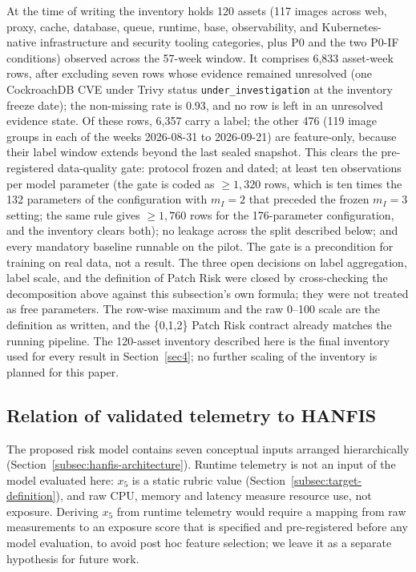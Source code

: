 \documentclass[referee,lineno,pdflatex,sn-basic]{sn-jnl}%
\theoremstyle{thmstyleone}%
\theoremstyle{thmstyletwo}%
\theoremstyle{thmstylethree}%
\begin{document}
At the time of writing the inventory holds 120 assets (117 images across web, proxy, cache, database, queue, runtime, base, observability, and Kubernetes-native infrastructure and security tooling categories, plus P0 and the two P0-IF conditions) observed across the 57-week window. It comprises 6{,}833 asset-week rows, after excluding seven rows whose evidence remained unresolved (one CockroachDB CVE under Trivy status \texttt{under\_investigation} at the inventory freeze date); the non-missing rate is 0.93, and no row is left in an unresolved evidence state. Of these rows, 6{,}357 carry a label; the other 476 (119 image groups in each of the weeks 2026-08-31 to 2026-09-21) are feature-only, because their label window extends beyond the last sealed snapshot. This clears the pre-registered data-quality gate: protocol frozen and dated; at least ten observations per model parameter (the gate is coded as $\ge 1{,}320$ rows, which is ten times the 132 parameters of the configuration with $m_I=2$ that preceded the frozen $m_I=3$ setting; the same rule gives $\ge 1{,}760$ rows for the 176-parameter configuration, and the inventory clears both); no leakage across the split described below; and every mandatory baseline runnable on the pilot. The gate is a precondition for training on real data, not a result. The three open decisions on label aggregation, label scale, and the definition of Patch Risk were closed by cross-checking the decomposition above against this subsection's own formula; they were not treated as free parameters. The row-wise maximum and the raw 0--100 scale are the definition as written, and the \{0,1,2\} Patch Risk contract already matches the running pipeline. The 120-asset inventory described here is the final inventory used for every result in
Section~\ref{sec4}; no further scaling of the inventory is planned for this paper.

\subsection{Relation of validated telemetry to HANFIS}
\label{subsec:hanfis-integration}

The proposed risk model contains seven conceptual inputs arranged hierarchically (Section~\ref{subsec:hanfis-architecture}). Runtime telemetry is not an input of the model evaluated here: $x_5$ is a static rubric value (Section~\ref{subsec:target-definition}), and raw CPU, memory and latency measure resource use, not exposure. Deriving $x_5$ from runtime telemetry would require a mapping from raw measurements to an exposure score that is specified and pre-registered before any model evaluation, to avoid post hoc feature selection; we leave it as a separate hypothesis for future work.
\end{document}
